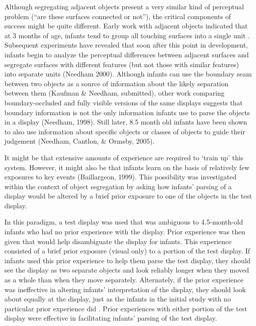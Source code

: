 Although segregating adjacent objects present a very similar kind of
perceptual problem (``are these surfaces connected or not''), the
critical components of success might be quite different.  Early work
with adjacent objects indicated that at 3 months of age, infants tend
to group all touching surfaces into a single unit
\cite{kestenbaum87perception}.  Subsequent experiments have revealed
that soon after this point in development, infants begin to analyze
the perceptual differences between adjacent surfaces and segregate
surfaces with different features (but not those with similar features)
into separate units (Needham 2000).
%
\ifverbose
Although infants can use the boundary seam between
two objects as a source of information about the likely separation
between them (Kaufman \& Needham, submitted), other work comparing
boundary-occluded and fully visible versions of the same displays
suggests that boundary information is not the only information infants
use to parse the objects in a display (Needham, 1998).  
\fi
%
Still later,
8.5 month old infants have been shown to also use information about specific
objects or classes of objects to guide their judgement (Needham,
Cantlon, \& Ormsby, 2005).



It might be that extensive amounts of experience are required to
`train up' this system.  However, it might also be that infants learn
on the basis of relatively few exposures to key events (Baillargeon,
1999).  This possibility was investigated within the context of object
segregation by asking how infants' parsing of a display would be
altered by a brief prior exposure to one of the objects in the test
display.


In this paradigm, a test display was used that was ambiguous to
4.5-month-old infants who had no prior experience with the display.
Prior experience was then given that would help disambiguate the display
for infants.  This experience consisted of a brief prior exposure
(visual only) to a portion of the test display.  If infants used this
prior experience to help them parse the test display, they should see
the display as two separate objects and look reliably longer when they
moved as a whole than when they move separately.  Alternately, if the
prior experience was ineffective in altering infants'
interpretation of the display, they should look about equally at the
display, just as the infants in the initial study with no particular
prior experience did \cite{needham98effects}.  Prior experiences
with either portion of the test display were effective in facilitating
infants' parsing of the test display.  


